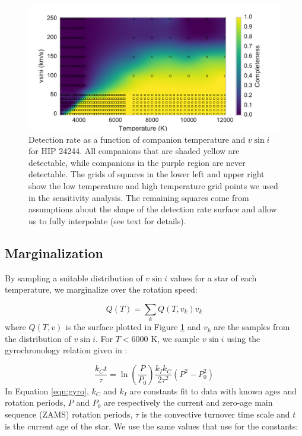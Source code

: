 \documentclass{emulateapj}
\begin{document}
\begin{figure}
\includegraphics[width=\columnwidth]{HIP_24244_20130919.pdf}
\caption{Detection rate as a function of companion temperature and $v\sin{i}$ for HIP 24244. All companions that are shaded yellow are detectable, while companions in the purple region are never detectable. The grids of squares in the lower left and upper right show the low temperature and high temperature grid points we used in the sensitivity analysis. The remaining squares come from assumptions about the shape of the detection rate surface and allow us to fully interpolate (see text for details).}
\label{fig:detrate_2d}
\end{figure}

\subsection{Marginalization}
By sampling a suitable distribution of $v\sin{i}$ values for a star of each temperature, we marginalize over the rotation speed:

\begin{equation}
Q(T) = \sum_k Q(T, v_k) v_k 
\end{equation} 
where $Q(T, v)$ is the surface plotted in Figure \ref{fig:detrate_2d} and $v_k$ are the samples from the distribution of $v\sin{i}$. For $T < 6000$ K, we sample $v\sin{i}$ using the gyrochronology relation given in \citet{Barnes2010b}:

\begin{equation}
\frac{k_Ct}{\tau} = \ln\left ( \frac{P}{P_0} \right ) \frac{k_Ik_C}{2\tau^2} (P^2 - P_0^2)
\label{eqn:gyro}
\end{equation}
In Equation \ref{eqn:gyro}, $k_C$ and $k_I$ are constants fit to data with known ages and rotation periods, $P$ and $P_0$ are respectively the current and zero-age main sequence (ZAMS) rotation periods, $\tau$ is the convective turnover time scale and $t$ is the current age of the star. We use the same values that \cite{Barnes2010b} use for the constants:
\end{document}
